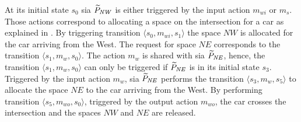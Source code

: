 At its initial state $s_0$ \gls{sia} $\widetilde{P}_{\mathit{NW}}$ is either triggered by the input action $m_{wi}$ or $m_s$.
Those actions correspond to allocating a space on the intersection for a car as explained in \Sect{\ref{sect_ecm_pnsc}}.
By triggering transition $\langle s_0, m_{wi}, s_1 \rangle$ the space $\mathit{NW}$ is allocated for the car arriving from the West.
The request for space $\mathit{NE}$ corresponds to the transition $\langle s_1, m_w, s_0 \rangle$.
The action $m_w$ is shared with \gls{sia} $\widetilde{P}_{\mathit{NE}}$, hence, the transition $\langle s_1, m_w, s_0 \rangle$ can only be triggered if $\widetilde{P}_{\mathit{NE}}$ is in its initial state $s_{3}$.
Triggered by the input action $m_w$, \gls{sia} $\widetilde{P}_{\mathit{NE}}$ performs the transition $\langle s_3, m_w, s_5 \rangle$ to allocate the space $\mathit{NE}$ to the car arriving from the West.
By performing transition $\langle s_5, m_{wo}, s_0 \rangle$, triggered by the output action $m_{wo}$, the car crosses the intersection and the spaces $\mathit{NW}$ and $\mathit{NE}$ are released.

